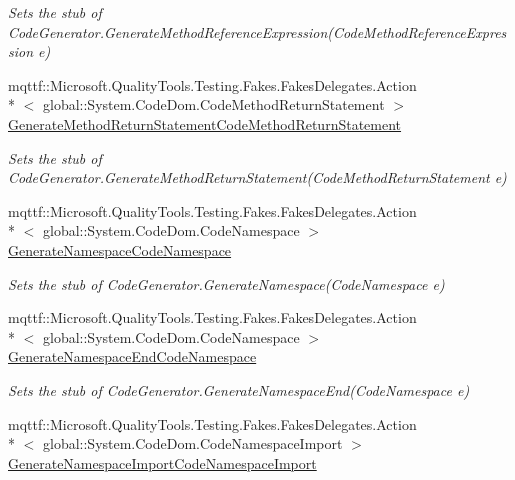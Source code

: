 \begin{DoxyCompactItemize}
\begin{DoxyCompactList}\small\item\em Sets the stub of Code\-Generator.\-Generate\-Method\-Reference\-Expression(\-Code\-Method\-Reference\-Expression e)\end{DoxyCompactList}\item 
mqttf\-::\-Microsoft.\-Quality\-Tools.\-Testing.\-Fakes.\-Fakes\-Delegates.\-Action\\*
$<$ global\-::\-System.\-Code\-Dom.\-Code\-Method\-Return\-Statement $>$ \hyperlink{class_system_1_1_code_dom_1_1_compiler_1_1_fakes_1_1_stub_code_compiler_a34b69a65e9845cda30f44e09d3dd109f}{Generate\-Method\-Return\-Statement\-Code\-Method\-Return\-Statement}
\begin{DoxyCompactList}\small\item\em Sets the stub of Code\-Generator.\-Generate\-Method\-Return\-Statement(\-Code\-Method\-Return\-Statement e)\end{DoxyCompactList}\item 
mqttf\-::\-Microsoft.\-Quality\-Tools.\-Testing.\-Fakes.\-Fakes\-Delegates.\-Action\\*
$<$ global\-::\-System.\-Code\-Dom.\-Code\-Namespace $>$ \hyperlink{class_system_1_1_code_dom_1_1_compiler_1_1_fakes_1_1_stub_code_compiler_a5dcd7b86cc638e6b87c5d465abbe9633}{Generate\-Namespace\-Code\-Namespace}
\begin{DoxyCompactList}\small\item\em Sets the stub of Code\-Generator.\-Generate\-Namespace(\-Code\-Namespace e)\end{DoxyCompactList}\item 
mqttf\-::\-Microsoft.\-Quality\-Tools.\-Testing.\-Fakes.\-Fakes\-Delegates.\-Action\\*
$<$ global\-::\-System.\-Code\-Dom.\-Code\-Namespace $>$ \hyperlink{class_system_1_1_code_dom_1_1_compiler_1_1_fakes_1_1_stub_code_compiler_a9a1812073cb4c4a8ab2fe137254e89fa}{Generate\-Namespace\-End\-Code\-Namespace}
\begin{DoxyCompactList}\small\item\em Sets the stub of Code\-Generator.\-Generate\-Namespace\-End(\-Code\-Namespace e)\end{DoxyCompactList}\item 
mqttf\-::\-Microsoft.\-Quality\-Tools.\-Testing.\-Fakes.\-Fakes\-Delegates.\-Action\\*
$<$ global\-::\-System.\-Code\-Dom.\-Code\-Namespace\-Import $>$ \hyperlink{class_system_1_1_code_dom_1_1_compiler_1_1_fakes_1_1_stub_code_compiler_a72bdef68ce4280c0c23af4fa847bd607}{Generate\-Namespace\-Import\-Code\-Namespace\-Import}

\end{DoxyCompactItemize}
